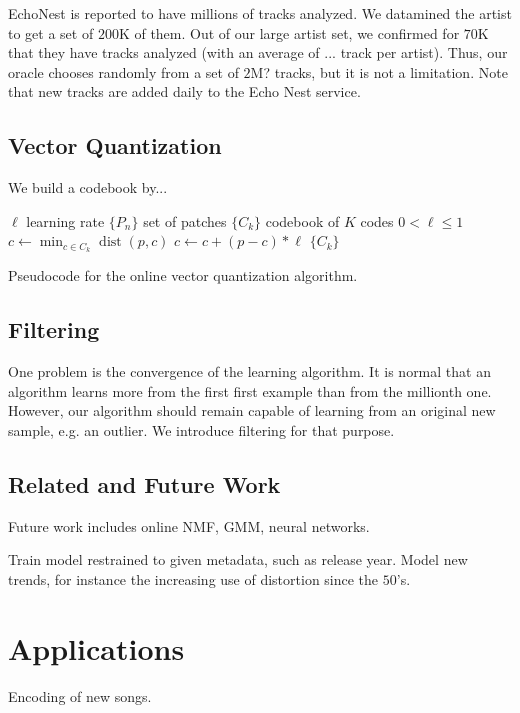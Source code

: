 \documentclass{sig-alternate}
\DeclareMathOperator*{\dist}{dist}
\begin{document}
EchoNest is reported to have millions of tracks analyzed. We datamined
the artist to get a set of $200$K of them. Out of our large artist set,
we confirmed for $70$K that they have tracks analyzed (with an average
of ... track per artist). Thus, our oracle chooses randomly from a set of
$2$M? tracks, but it is not a limitation. Note that new tracks are added
daily to the Echo Nest service.

\subsection{Vector Quantization}
We build a codebook by...

\begin{algorithm}
\begin{algorithmic}
\STATE$\ell$ learning rate
\STATE$\{P_n\}$ set of patches
\STATE$\{C_k\}$ codebook of $K$ codes
\REQUIRE $0 < \ell \leq 1$
\STATE$c \leftarrow \min_{c \in C_k} \dist(p,c)$
\STATE$c \leftarrow c + (p - c) * \ell$
\ENDFOR
\ENDFOR
\RETURN $\{C_k\}$
\caption{\small{Pseudocode for the online vector quantization
    algorithm.}\label{algo:vq}}
\end{algorithmic}
\end{algorithm}


\subsection{Filtering}
One problem is the convergence of the learning algorithm. It is normal
that an algorithm learns more from the first first example than from the
millionth one. However, our algorithm should remain capable of learning
from an original new sample, e.g. an outlier. We introduce filtering
for that purpose.

\subsection{Related and Future Work}
Future work includes online NMF, GMM, neural networks.

Train model restrained to given metadata, such as release year.
Model new trends, for instance the increasing use of distortion
since the $50$'s.

\section{Applications}
Encoding of new songs.
\end{document}
